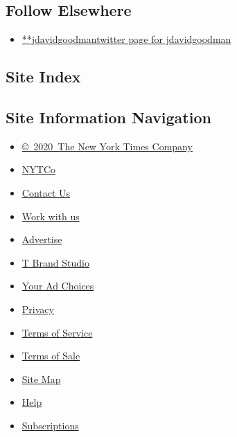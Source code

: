\hypertarget{follow-elsewhere}{%
\subsection{Follow Elsewhere}\label{follow-elsewhere}}

\begin{itemize}
\tightlist
\item
  \href{https://twitter.com/jdavidgoodman}{**jdavidgoodmantwitter page
  for jdavidgoodman}
\end{itemize}

\hypertarget{site-index}{%
\subsection{Site Index}\label{site-index}}

\hypertarget{site-information-navigation}{%
\subsection{Site Information
Navigation}\label{site-information-navigation}}

\begin{itemize}
\tightlist
\item
  \href{https://help.nytimes.com/hc/en-us/articles/115014792127-Copyright-notice}{©~2020~The
  New York Times Company}
\end{itemize}

\begin{itemize}
\tightlist
\item
  \href{https://www.nytco.com/}{NYTCo}
\item
  \href{https://help.nytimes.com/hc/en-us/articles/115015385887-Contact-Us}{Contact
  Us}
\item
  \href{https://www.nytco.com/careers/}{Work with us}
\item
  \href{https://nytmediakit.com/}{Advertise}
\item
  \href{http://www.tbrandstudio.com/}{T Brand Studio}
\item
  \href{https://www.nytimes.com/privacy/cookie-policy\#how-do-i-manage-trackers}{Your
  Ad Choices}
\item
  \href{https://www.nytimes.com/privacy}{Privacy}
\item
  \href{https://help.nytimes.com/hc/en-us/articles/115014893428-Terms-of-service}{Terms
  of Service}
\item
  \href{https://help.nytimes.com/hc/en-us/articles/115014893968-Terms-of-sale}{Terms
  of Sale}
\item
  \href{https://spiderbites.nytimes.com}{Site Map}
\item
  \href{https://help.nytimes.com/hc/en-us}{Help}
\item
  \href{https://www.nytimes.com/subscription?campaignId=37WXW}{Subscriptions}
\end{itemize}
